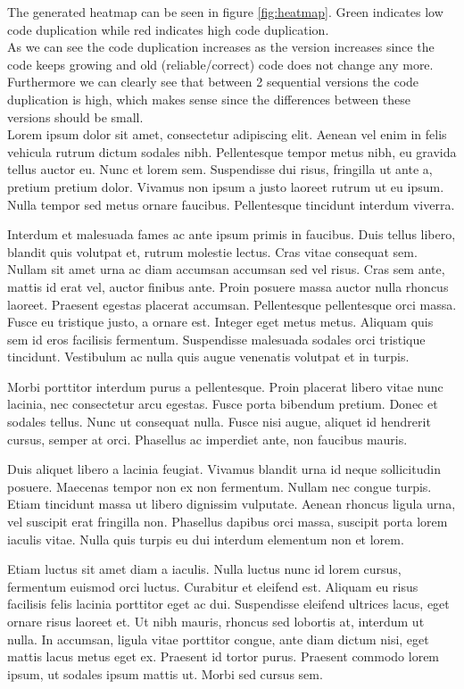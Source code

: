 \documentclass[a4paper,twoside,11pt]{article}
\begin{document}
The generated heatmap can be seen in figure \ref{fig:heatmap}. Green indicates low code duplication while red indicates high code duplication. \\

As we can see the code duplication increases as the version increases since the code keeps growing and old (reliable/correct) code does not change any more. Furthermore we can clearly see that between 2 sequential versions the code duplication is high, which makes sense since the differences between these versions should be small. \\

Lorem ipsum dolor sit amet, consectetur adipiscing elit. Aenean vel enim in felis vehicula rutrum dictum sodales nibh. Pellentesque tempor metus nibh, eu gravida tellus auctor eu. Nunc et lorem sem. Suspendisse dui risus, fringilla ut ante a, pretium pretium dolor. Vivamus non ipsum a justo laoreet rutrum ut eu ipsum. Nulla tempor sed metus ornare faucibus. Pellentesque tincidunt interdum viverra.

Interdum et malesuada fames ac ante ipsum primis in faucibus. Duis tellus libero, blandit quis volutpat et, rutrum molestie lectus. Cras vitae consequat sem. Nullam sit amet urna ac diam accumsan accumsan sed vel risus. Cras sem ante, mattis id erat vel, auctor finibus ante. Proin posuere massa auctor nulla rhoncus laoreet. Praesent egestas placerat accumsan. Pellentesque pellentesque orci massa. Fusce eu tristique justo, a ornare est. Integer eget metus metus. Aliquam quis sem id eros facilisis fermentum. Suspendisse malesuada sodales orci tristique tincidunt. Vestibulum ac nulla quis augue venenatis volutpat et in turpis.

Morbi porttitor interdum purus a pellentesque. Proin placerat libero vitae nunc lacinia, nec consectetur arcu egestas. Fusce porta bibendum pretium. Donec et sodales tellus. Nunc ut consequat nulla. Fusce nisi augue, aliquet id hendrerit cursus, semper at orci. Phasellus ac imperdiet ante, non faucibus mauris.

Duis aliquet libero a lacinia feugiat. Vivamus blandit urna id neque sollicitudin posuere. Maecenas tempor non ex non fermentum. Nullam nec congue turpis. Etiam tincidunt massa ut libero dignissim vulputate. Aenean rhoncus ligula urna, vel suscipit erat fringilla non. Phasellus dapibus orci massa, suscipit porta lorem iaculis vitae. Nulla quis turpis eu dui interdum elementum non et lorem.

Etiam luctus sit amet diam a iaculis. Nulla luctus nunc id lorem cursus, fermentum euismod orci luctus. Curabitur et eleifend est. Aliquam eu risus facilisis felis lacinia porttitor eget ac dui. Suspendisse eleifend ultrices lacus, eget ornare risus laoreet et. Ut nibh mauris, rhoncus sed lobortis at, interdum ut nulla. In accumsan, ligula vitae porttitor congue, ante diam dictum nisi, eget mattis lacus metus eget ex. Praesent id tortor purus. Praesent commodo lorem ipsum, ut sodales ipsum mattis ut. Morbi sed cursus sem.
\end{document}
